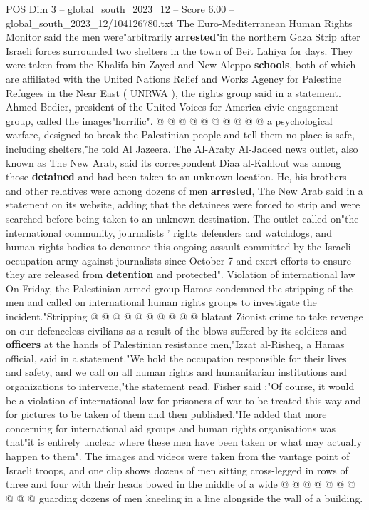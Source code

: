 \begin{textsample}{POS Dim 3 – global\_south\_2023\_12 – Score 6.00 – global\_south\_2023\_12/104126780.txt}
The Euro-Mediterranean Human Rights Monitor said the men were"arbitrarily \textbf{arrested}"in the northern Gaza Strip after Israeli forces surrounded two shelters in the town of Beit Lahiya for days.
They were taken from the Khalifa bin Zayed and New Aleppo \textbf{schools}, both of which are affiliated with the United Nations Relief and Works Agency for Palestine Refugees in the Near East ( UNRWA ), the rights group said in a statement.
Ahmed Bedier, president of the United Voices for America civic engagement group, called the images"horrific". @ @ @ @ @ @ @ @ @ @ a psychological warfare, designed to break the Palestinian people and tell them no place is safe, including shelters,"he told Al Jazeera.
The Al-Araby Al-Jadeed news outlet, also known as The New Arab, said its correspondent Diaa al-Kahlout was among those \textbf{detained} and had been taken to an unknown location.
He, his brothers and other relatives were among dozens of men \textbf{arrested}, The New Arab said in a statement on its website, adding that the detainees were forced to strip and were searched before being taken to an unknown destination.
The outlet called on"the international community, journalists ' rights defenders and watchdogs, and human rights bodies to denounce this ongoing assault committed by the Israeli occupation army against journalists since October 7 and exert efforts to ensure they are released from \textbf{detention} and protected".
Violation of international law On Friday, the Palestinian armed group Hamas condemned the stripping of the men and called on international human rights groups to investigate the incident."Stripping @ @ @ @ @ @ @ @ @ @ blatant Zionist crime to take revenge on our defenceless civilians as a result of the blows suffered by its soldiers and \textbf{officers} at the hands of Palestinian resistance men,"Izzat al-Risheq, a Hamas official, said in a statement."We hold the occupation responsible for their lives and safety, and we call on all human rights and humanitarian institutions and organizations to intervene,"the statement read.
Fisher said :"Of course, it would be a violation of international law for prisoners of war to be treated this way and for pictures to be taken of them and then published."He added that more concerning for international aid groups and human rights organisations was that"it is entirely unclear where these men have been taken or what may actually happen to them".
The images and videos were taken from the vantage point of Israeli troops, and one clip shows dozens of men sitting cross-legged in rows of three and four with their heads bowed in the middle of a wide @ @ @ @ @ @ @ @ @ @ guarding dozens of men kneeling in a line alongside the wall of a building.

\end{textsample}
